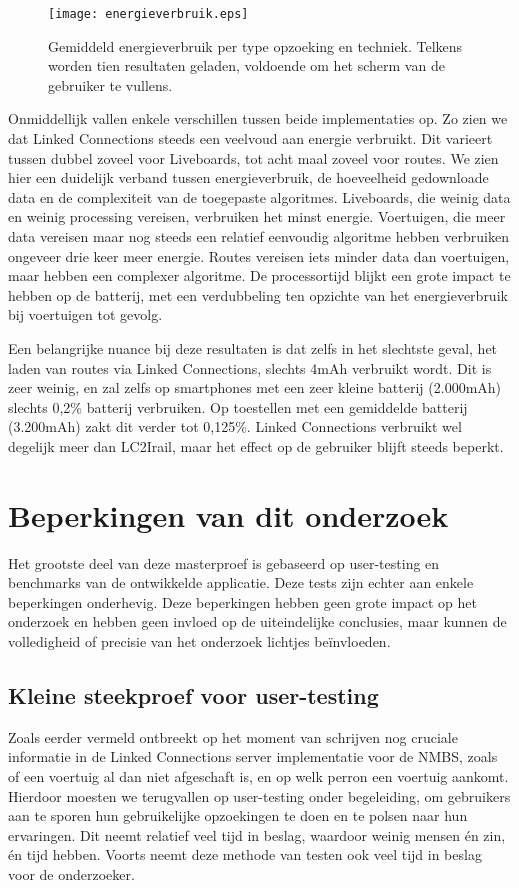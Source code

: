 \begin{figure}[ht]
	\centering
	\texttt{[image: energieverbruik.eps]}
	\caption[Energieverbruik per opzoeking]{Gemiddeld energieverbruik per type opzoeking en techniek. Telkens worden tien resultaten geladen, voldoende om het scherm van de gebruiker te vullens.}
	\label{fig:batteryUsage}
\end{figure}

Onmiddellijk vallen enkele verschillen tussen beide implementaties op. Zo zien we dat Linked Connections steeds een veelvoud aan energie verbruikt. Dit varieert tussen dubbel zoveel voor Liveboards, tot acht maal zoveel voor routes. We zien hier een duidelijk verband tussen energieverbruik, de hoeveelheid gedownloade data en de complexiteit van de toegepaste algoritmes.
Liveboards, die weinig data en weinig processing vereisen, verbruiken het minst energie. Voertuigen, die meer data vereisen maar nog steeds een relatief eenvoudig algoritme hebben verbruiken ongeveer drie keer meer energie. Routes vereisen iets minder data dan voertuigen,  maar hebben een complexer algoritme. De processortijd blijkt een grote impact te hebben op de batterij, met een verdubbeling ten opzichte van het energieverbruik bij voertuigen tot gevolg.

Een belangrijke nuance bij deze resultaten is dat zelfs in het slechtste geval, het laden van routes via Linked Connections, slechts 4mAh verbruikt wordt. Dit is zeer weinig, en zal zelfs op smartphones met een zeer kleine batterij (2.000mAh) slechts 0,2\% batterij verbruiken. Op toestellen met een gemiddelde batterij (3.200mAh) zakt dit verder tot 0,125\%. Linked Connections verbruikt wel degelijk meer dan LC2Irail, maar het effect op de gebruiker blijft steeds beperkt.

\section{Beperkingen van dit onderzoek}
\label{sec:beperkingen}

Het grootste deel van deze masterproef is gebaseerd op user-testing en benchmarks van de ontwikkelde applicatie. Deze tests zijn echter aan enkele beperkingen onderhevig. Deze beperkingen hebben geen grote impact op het onderzoek en hebben geen invloed op de uiteindelijke conclusies, maar kunnen de volledigheid of precisie van het onderzoek lichtjes beïnvloeden.

\subsection{Kleine steekproef voor user-testing}
Zoals eerder vermeld ontbreekt op het moment van schrijven nog cruciale informatie in de Linked Connections server implementatie voor de NMBS, zoals of een voertuig al dan niet afgeschaft is, en op welk perron een voertuig aankomt. Hierdoor moesten we terugvallen op user-testing onder begeleiding, om gebruikers aan te sporen hun gebruikelijke opzoekingen te doen en te polsen naar hun ervaringen. Dit neemt relatief veel tijd in beslag, waardoor weinig mensen én zin, én tijd hebben. Voorts neemt deze methode van testen ook veel tijd in beslag voor de onderzoeker. 

